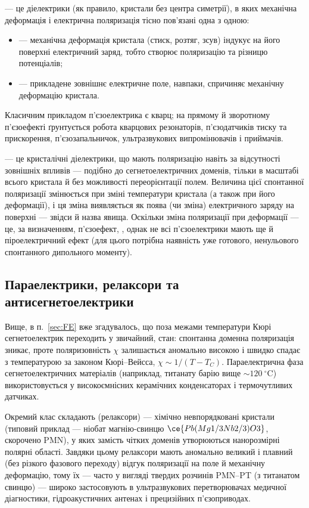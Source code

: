  --- це діелектрики (як правило, кристали без центра симетрії), в яких механічна деформація і електрична поляризація тісно
пов'язані одна з одною:
\begin{itemize}
	\item {} --- механічна деформація кристала (стиск, розтяг, зсув) індукує на його поверхні електричний заряд, тобто
	      створює поляризацію та різницю потенціалів;
	\item {} --- прикладене зовнішнє електричне поле, навпаки, спричиняє механічну деформацію кристала.
\end{itemize}
Класичним прикладом п'єзоелектрика є кварц; на прямому й зворотному п'єзоефекті ґрунтується робота кварцових резонаторів, п'єзодатчиків тиску та
прискорення, п'єзозапальничок, ультразвукових випромінювачів і приймачів.

 --- це кристалічні діелектрики, що мають  поляризацію навіть за відсутності зовнішніх впливів --- подібно до
сегнетоелектричних доменів, тільки в масштабі всього кристала й без можливості переорієнтації полем. Величина цієї спонтанної поляризації
змінюється при зміні температури кристала (а також при його деформації), і ця зміна виявляється як поява (чи зміна) електричного заряду на
поверхні --- звідси й назва явища. Оскільки зміна поляризації при деформації --- це, за визначенням, п'єзоефект, , однак не всі п'єзоелектрики мають ще й піроелектричний ефект (для цього потрібна наявність уже готового, ненульового
спонтанного дипольного моменту).

\subsection*{Параелектрики, релаксори та антисегнетоелектрики}

Вище, в п.~\ref{sec:FE} вже згадувалось, що поза межами температури Кюрі сегнетоелектрик переходить у звичайний,  стан:
спонтанна доменна поляризація зникає, проте поляризовність $\chi$ залишається аномально високою і швидко спадає з температурою за законом
Кюрі--Вейсса, $\chi \sim 1/(T-T_C)$. Параелектрична фаза сегнетоелектричних матеріалів (наприклад, титанату барію вище $\sim\!120\ ^\circ\text{C}$)
використовується у високоємнісних керамічних конденсаторах і термочутливих датчиках.

Окремий клас складають  (релаксори) --- хімічно невпорядковані кристали (типовий приклад --- ніобат
магнію-свинцю $\ce{Pb(Mg1/3Nb2/3)O3}$, скорочено PMN), у яких замість чітких доменів утворюються нанорозмірні полярні області. Завдяки цьому релаксори
мають аномально великий і плавний (без різкого фазового переходу) відгук поляризації на поле й механічну деформацію, тому їх --- часто у вигляді
твердих розчинів PMN--PT (з титанатом свинцю) --- широко застосовують в ультразвукових перетворювачах медичної діагностики, гідроакустичних
антенах і прецизійних п'єзоприводах.


